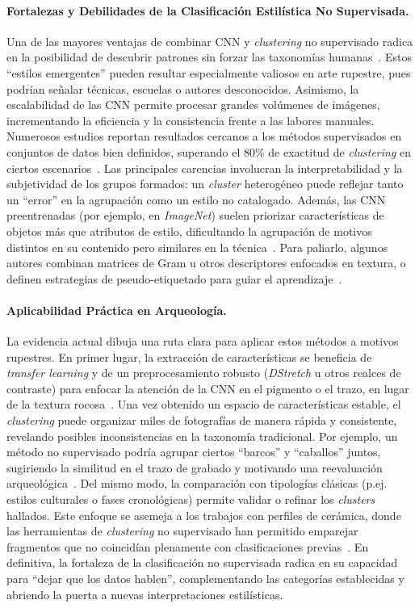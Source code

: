 \paragraph{Fortalezas y Debilidades de la Clasificación Estilística No Supervisada.}
Una de las mayores ventajas de combinar CNN y \textit{clustering} no supervisado radica en la posibilidad de descubrir patrones sin forzar las taxonomías humanas~\cite{castellano2022,wynen2018}.
Estos “estilos emergentes” pueden resultar especialmente valiosos en arte rupestre, pues podrían señalar técnicas, escuelas o autores desconocidos. Asimismo, la escalabilidad de las CNN permite procesar grandes volúmenes de imágenes, incrementando la eficiencia y la consistencia frente a las labores manuales.
Numerosos estudios reportan resultados cercanos a los métodos supervisados en conjuntos de datos bien definidos, superando el 80\% de exactitud de \textit{clustering} en ciertos escenarios~\cite{xue2023}.
Las principales carencias involucran la interpretabilidad y la subjetividad de los grupos formados: un \textit{cluster} heterogéneo puede reflejar tanto un “error” en la agrupación como un estilo no catalogado.
Además, las CNN preentrenadas (por ejemplo, en \textit{ImageNet}) suelen priorizar características de objetos más que atributos de estilo, dificultando la agrupación de motivos distintos en su contenido pero similares en la técnica~\cite{gairola2020}.
Para paliarlo, algunos autores combinan matrices de Gram u otros descriptores enfocados en textura, o definen estrategias de pseudo-etiquetado para guiar el aprendizaje~\cite{gairola2020,dangeti2024}.

\paragraph{Aplicabilidad Práctica en Arqueología.}
La evidencia actual dibuja una ruta clara para aplicar estos métodos a motivos rupestres.
En primer lugar, la extracción de características se beneficia de \textit{transfer learning} y de un preprocesamiento robusto (\textit{DStretch} u otros realces de contraste) para enfocar la atención de la CNN en el pigmento o el trazo, en lugar de la textura rocosa~\cite{guerin2018}.
Una vez obtenido un espacio de características estable, el \textit{clustering} puede organizar miles de fotografías de manera rápida y consistente, revelando posibles inconsistencias en la taxonomía tradicional.
Por ejemplo, un método no supervisado podría agrupar ciertos “barcos” y “caballos” juntos, sugiriendo la similitud en el trazo de grabado y motivando una reevaluación arqueológica~\cite{gairola2020}.
Del mismo modo, la comparación con tipologías clásicas (p.ej. estilos culturales o fases cronológicas) permite validar o refinar los \textit{clusters} hallados.
Este enfoque se asemeja a los trabajos con perfiles de cerámica, donde las herramientas de \textit{clustering} no supervisado han permitido emparejar fragmentos que no coincidían plenamente con clasificaciones previas~\cite{parisotto2022}.
En definitiva, la fortaleza de la clasificación no supervisada radica en su capacidad para “dejar que los datos hablen”, complementando las categorías establecidas y abriendo la puerta a nuevas interpretaciones estilísticas.

